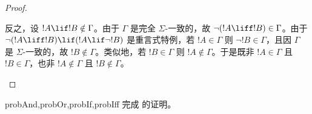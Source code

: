 \documentclass[../../../include/open-logic-section]{subfiles}
\begin{document}
\begin{proof}
\begin{enumerate}
{{      反之，设 $!A \lif !B \notin \Gamma$。由于 $\Gamma$ 是完全 $\Sigma$-一致的，故 $\lnot (!A \liff !B) \in \Gamma$。由于 $\lnot(!A \liff !B) \lif (!A \lif \lnot !B)$ 是重言式特例，若 $!A \in \Gamma$ 则 $\lnot !B \in \Gamma$，且因 $\Gamma$ 是 $\Sigma$-一致的，故 $!B \notin \Gamma$。类似地，若 $!B \in \Gamma$ 则 $!A \notin \Gamma$。于是既非 $!A \in \Gamma$ 且 $!B \in \Gamma$，也非 $!A \notin \Gamma$ 且 $!B \notin \Gamma$。}}{}
  \end{enumerate}
\end{proof}

\begin{probtag}{probAnd,probOr,probIf,probIff}
  完成  的证明。
\end{probtag}
\end{document}

